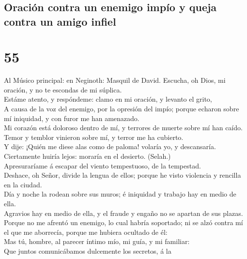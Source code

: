 \hypertarget{oraciuxf3n-contra-un-enemigo-impuxedo-y-queja-contra-un-amigo-infiel}{%
\subsection{Oración contra un enemigo impío y queja contra un amigo
infiel}\label{oraciuxf3n-contra-un-enemigo-impuxedo-y-queja-contra-un-amigo-infiel}}

\hypertarget{section-19-55}{%
\section{55}\label{section-19-55}}

 Al Músico principal: en Neginoth: Masquil de David.
Escucha, oh Dios, mi oración, y no te escondas de mi súplica.\\
 Estáme atento, y respóndeme: clamo en mi oración, y
levanto el grito,\\
 A causa de la voz del enemigo, por la opresión del impío;
porque echaron sobre mí iniquidad, y con furor me han amenazado.\\
 Mi corazón está doloroso dentro de mí, y terrores de
muerte sobre mí han caído.\\
 Temor y temblor vinieron sobre mí, y terror me ha
cubierto.\\
 Y dije: ¡Quién me diese alas como de paloma! volaría yo,
y descansaría.\\
 Ciertamente huiría lejos: moraría en el desierto.
(Selah.)\\
 Apresuraríame á escapar del viento tempestuoso, de la
tempestad.\\
 Deshace, oh Señor, divide la lengua de ellos; porque he
visto violencia y rencilla en la ciudad.\\
 Día y noche la rodean sobre sus muros; é iniquidad y
trabajo hay en medio de ella.\\
 Agravios hay en medio de ella, y el fraude y engaño no
se apartan de sus plazas.\\
 Porque no me afrentó un enemigo, lo cual habría
soportado; ni se alzó contra mí el que me aborrecía, porque me hubiera
ocultado de él:\\
 Mas tú, hombre, al parecer íntimo mío, mi guía, y mi
familiar:\\
 Que juntos comunicábamos dulcemente los secretos, á la
